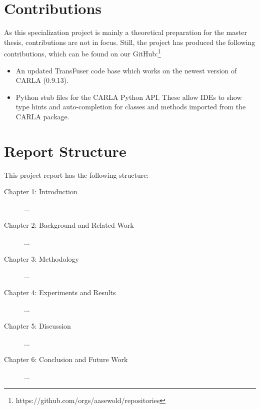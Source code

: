 \section{Contributions}
As this specialization project is mainly a theoretical preparation for the master thesis, contributions are not in focus. Still, the project has produced the following contributions, which can be found on our GitHub:\footnote{https://github.com/orgs/aasewold/repositories}

\begin{itemize}
    \item An updated TransFuser code base which works on the newest version of CARLA (0.9.13).
    \item Python stub files for the CARLA Python API. These allow IDEs to show type hints and auto-completion for classes and methods imported from the CARLA package.
\end{itemize}


\section{Report Structure} %
This project report has the following structure:

\begin{description}
    \item[Chapter 1: Introduction] ...
    \item[Chapter 2: Background and Related Work] ...
    \item[Chapter 3: Methodology] ...
    \item[Chapter 4: Experiments and Results] ...
    \item[Chapter 5: Discussion] ...
    \item[Chapter 6: Conclusion and Future Work] ...
\end{description}
